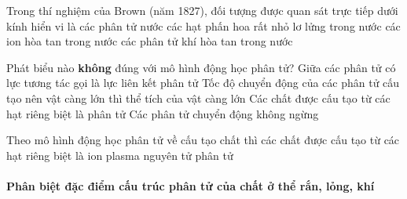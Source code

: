 \begin{ex}
 {\color{red}\footnotesize\ttfamily [L12C1B1-TN-45]}\par %
 Trong thí nghiệm của Brown (năm 1827), đối tượng được quan sát trực tiếp dưới kính hiển vi là
 \choice
 {các phân tử nước}
 {\True các hạt phấn hoa rất nhỏ lơ lửng trong nước}
 {các ion hòa tan trong nước}
 {các phân tử khí hòa tan trong nước}
\end{ex}

\begin{ex}
 {\color{red}\footnotesize\ttfamily [L12C1B1-TN-2]}\par %
 Phát biểu nào \textbf{không} đúng với mô hình động học phân tử?
 \choice
 {Giữa các phân tử có lực tương tác gọi là lực liên kết phân tử}
 {\True Tốc độ chuyển động của các phân tử cấu tạo nên vật càng lớn thì thể tích của vật càng lớn}
 {Các chất được cấu tạo từ các hạt riêng biệt là phân tử}
 {Các phân tử chuyển động không ngừng}
\end{ex}

\begin{ex}
 {\color{red}\footnotesize\ttfamily [L12C1B1-TN-17]}\par %
 Theo mô hình động học phân tử về cấu tạo chất thì các chất được cấu tạo từ các hạt riêng biệt là
 \choice
 {ion}
 {plasma}
 {nguyên tử}
 {\True phân tử}
\end{ex}

\paragraph{Phân biệt đặc điểm cấu trúc phân tử của chất ở thể rắn, lỏng, khí}

